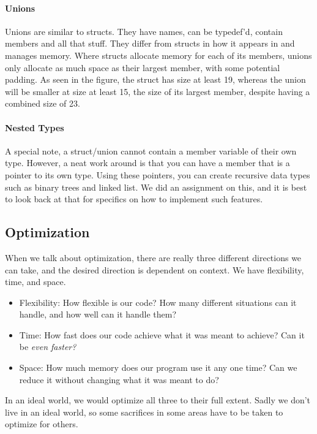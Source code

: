 \paragraph{Unions}
Unions are similar to structs. They have names, can be typedef'd, contain members and all that stuff. They differ from structs in how it appears in and manages memory. Where structs allocate memory for each of its members, unions only allocate as much space as their largest member, with some potential padding. As seen in the figure, the struct has size at least 19, whereas the union will be smaller at size at least 15, the size of its largest member, despite having a combined size of 23.

\paragraph{Nested Types} A special note, a struct/union cannot contain a member variable of their own type. However, a neat work around is that you can have a member that is a pointer to its own type. Using these pointers, you can create recursive data types such as binary trees and linked list. We did an assignment on this, and it is best to look back at that for specifics on how to implement such features. 

\subsection{Optimization}
When we talk about optimization, there are really three different directions we can take, and the desired direction is dependent on context. We have flexibility, time, and space.
\begin{itemize}
	\item Flexibility: How flexible is our code? How many different situations can it handle, and how well can it handle them?
	\item Time: How fast does our code achieve what it was meant to achieve? Can it be \textit{even faster?}
	\item Space: How much memory does our program use it any one time? Can we reduce it without changing what it was meant to do?
\end{itemize}
In an ideal world, we would optimize all three to their full extent. Sadly we don't live in an ideal world, so some sacrifices in some areas have to be taken to optimize for others. 
